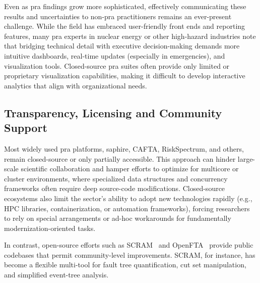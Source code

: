 Even as \acrshort{pra} findings grow more sophisticated, effectively communicating these results and uncertainties to non-\acrshort{pra} practitioners remains an ever-present challenge. While the field has embraced user-friendly front ends and reporting features, many \acrshort{pra} experts in nuclear energy or other high-hazard industries note that bridging technical detail with executive decision-making demands more intuitive dashboards, real-time updates (especially in emergencies), and visualization tools. Closed-source \acrshort{pra} suites often provide only limited or proprietary visualization capabilities, making it difficult to develop interactive analytics that align with organizational needs.

\subsection{Transparency, Licensing and Community Support}

Most widely used \acrshort{pra} platforms, \acrshort{saphire}, CAFTA, RiskSpectrum, and others, remain closed-source or only partially accessible. This approach can hinder large-scale scientific collaboration and hamper efforts to optimize for multicore or cluster environments, where specialized data structures and concurrency frameworks often require deep source-code modifications. Closed-source ecosystems also limit the sector's ability to adopt new technologies rapidly (e.g., HPC libraries, containerization, or automation frameworks), forcing researchers to rely on special arrangements or ad-hoc workarounds for fundamentally modernization-oriented tasks.

In contrast, open-source efforts such as SCRAM~\cite{scram} and OpenFTA~\cite{opensource_fta_tools} provide public codebases that permit community-level improvements. SCRAM, for instance, has become a flexible multi-tool for fault tree quantification, cut set manipulation, and simplified event-tree analysis.

